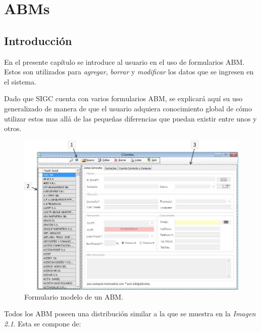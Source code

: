 \documentclass{book}
\begin{document}
%
%
\chapter{ABMs}


\section{Introducción}

En el presente capítulo se introduce al usuario en el uso de formularios ABM. Estos son utilizados para \textit{agregar}, \textit{borrar} y \textit{modificar} los datos que se ingresen en el sistema. 
\par
Dado que SIGC cuenta con varios formularios ABM, se explicará aquí su uso generalizado de manera de que el usuario adquiera conocimiento global de cómo utilizar estos mas allá de las pequeñas diferencias que puedan existir entre unos y otros.
\bigskip\bigskip


\begin{figure}[H]
	\centering
	\includegraphics[width=1.0\textwidth]{images/ventanas/ventana-03.jpg}
	\caption{Formulario modelo de un ABM.}
	\medskip
\end{figure}
\bigskip\bigskip
\newpage


Todos los ABM poseen una distribución similar a la que se muestra en la \textit{Imagen 2.1}. Esta se compone de:
\bigskip
\end{document}
